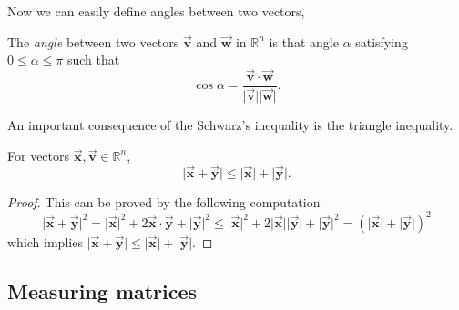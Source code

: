 \documentclass[12pt]{article}
\theoremstyle{remark}
\let\oldvec = \vec
\renewcommand{\vec}[1]{\oldvec{\mathbf{#1}}}
\numberwithin{equation}{section}
\begin{document}
Now we can easily define angles between two vectors, 
\begin{definition}
	The \textit{angle} between two vectors $ \vec{v} $ and $ \vec{w} $ in $ \mathbb{R}^n $ is that angle $ \alpha $ satisfying $ 0 \leq \alpha \leq \pi $ such that 
	\begin{equation}
		\cos{\alpha} = \frac{\vec{v} \cdot \vec{w}}{\lvert \vec{v} \rvert \lvert \vec{w} \rvert}.
	\end{equation}
	
\end{definition}



An important consequence of the Schwarz's inequality is the triangle inequality. 

\begin{important}
	For vectors $ \vec{x}, \vec{v} \in \mathbb{R}^n $, 
	\begin{equation}
	    \lvert \vec{x} + \vec{y} \rvert \leq \lvert \vec{x} \rvert + \lvert \vec{y} \rvert.
	\end{equation}
\end{important}

\begin{proof}
   This can be proved by the following computation
   \begin{equation}
       \lvert \vec{x} + \vec{y} \rvert^2 = \lvert \vec{x} \rvert^2 + 2 \vec{x} \cdot \vec{y} + \lvert \vec{y} \rvert^2 \leq \lvert \vec{x} \rvert^2 + 2 \lvert \vec{x}\rvert \lvert \vec{y} \rvert + \lvert \vec{y} \rvert^2 = (\lvert \vec{x} \rvert + \lvert \vec{y} \rvert)^2 
   \end{equation}
   which implies $ \lvert \vec{x} + \vec{y} \rvert \leq \lvert \vec{x} \rvert + \lvert \vec{y} \rvert. $
\end{proof}

\subsection{Measuring matrices}%
\label{sub:Measuring matrices}




\end{document}
